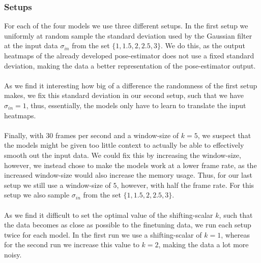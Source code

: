 \documentclass[./main.tex]{subfiles}
\begin{document}
\subsubsection{Setups} For each of the four models we use three different setups. In the first setup we uniformly at random sample the standard deviation used by the Gaussian filter at the input data $\sigma_{in}$ from the set $\{1, 1.5, 2, 2.5, 3\}$. We do this, as the output heatmaps of the already developed pose-estimator does not use a fixed standard deviation, making the data a better representation of the pose-estimator output. 
\\
\\
As we find it interesting how big of a difference the randomness of the first setup makes, we fix this standard deviation in our second setup, such that we have $\sigma_{in} = 1$, thus, essentially, the models only have to learn to translate the input heatmaps.
\\
\\
Finally, with $30$ frames per second and a window-size of $k = 5$, we suspect that the models might be given too little context to actually be able to effectively smooth out the input data. We could fix this by increasing the window-size, however, we instead chose to make the models work at a lower frame rate, as the increased window-size would also increase the memory usage. Thus, for our last setup we still use a window-size of $5$, however, with half the frame rate. For this setup we also sample $\sigma_{in}$ from the set $\{1, 1.5, 2, 2.5, 3\}$.
\\
\\
As we find it difficult to set the optimal value of the shifting-scalar $k$, such that the data becomes as close as possible to the finetuning data, we run each setup twice for each model. In the first run we use a shifting-scalar of $k = 1$, whereas for the second run we increase this value to $k = 2$, making the data a lot more noisy.
\end{document}
